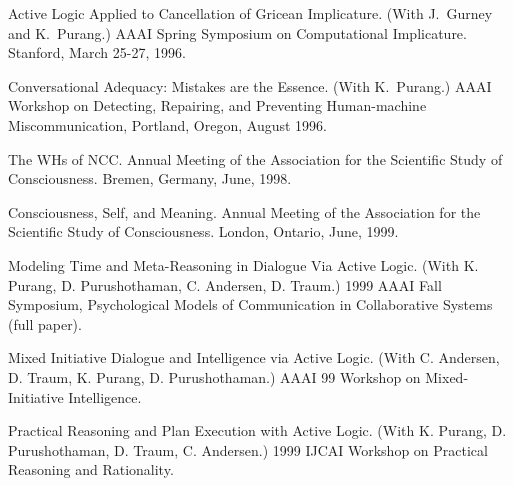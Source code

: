 \paper
Active Logic Applied to Cancellation of Gricean Implicature.
(With J.~Gurney and K.~Purang.) AAAI Spring Symposium on
Computational Implicature. Stanford, March 25-27, 1996.

\paper
Conversational Adequacy: Mistakes are the Essence.  (With K.~Purang.)
AAAI Workshop on Detecting, Repairing, and Preventing Human-machine
Miscommunication, Portland, Oregon, August 1996.

\paper
The WHs of NCC.  Annual Meeting of the Association for the Scientific
Study of Consciousness. Bremen, Germany, June, 1998.

\paper
Consciousness, Self, and Meaning.
Annual Meeting of the Association for the Scientific
Study of Consciousness. London, Ontario, June, 1999.

\paper
Modeling Time and Meta-Reasoning in Dialogue Via Active Logic.
(With K. Purang, D. Purushothaman, C. Andersen, D. Traum.)
1999 AAAI Fall Symposium, Psychological Models of Communication in
Collaborative Systems (full paper).

\paper
Mixed Initiative Dialogue and Intelligence via Active Logic.
(With C. Andersen, D. Traum, K. Purang, D. Purushothaman.)
AAAI 99 Workshop on Mixed-Initiative Intelligence.

\paper
Practical Reasoning and Plan Execution with Active Logic.
(With K. Purang, D. Purushothaman,  D. Traum, C. Andersen.)
1999 IJCAI Workshop on Practical Reasoning and Rationality.

